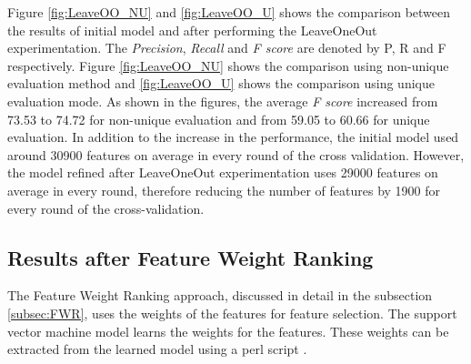 Figure \ref{fig:LeaveOO_NU} and \ref{fig:LeaveOO_U} shows the comparison between the results of initial model and after performing the LeaveOneOut experimentation.  The \textit{Precision}, \textit{Recall} and \textit{F score} are denoted by P, R and F respectively. Figure \ref{fig:LeaveOO_NU} shows the comparison using non-unique evaluation method and \ref{fig:LeaveOO_U} shows the comparison using unique evaluation mode. As shown in the figures, the average \textit{F score} increased from 73.53 to 74.72 for non-unique evaluation and from 59.05 to 60.66 for unique evaluation. In addition to the increase in the performance, the initial model used around 30900 features on average in every round of the cross validation. However, the model refined after LeaveOneOut experimentation uses 29000 features on average in every round, therefore reducing the number of features by 1900 for every round of the cross-validation.

\subsection{Results after Feature Weight Ranking}

The Feature Weight Ranking approach, discussed in detail in the subsection \ref{subsec:FWR}, uses the weights of the features for feature selection. The support vector machine model learns the weights for the features. These weights can be extracted from the learned model using a perl script \cite{svmlightonline}. 


